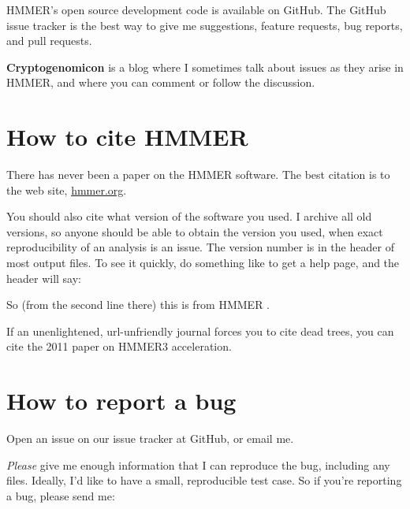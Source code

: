 HMMER's open source development code is available on
GitHub.
The GitHub issue tracker is the best way to give me suggestions,
feature requests, bug reports, and pull requests.

\textbf{Cryptogenomicon}
  is a blog where I sometimes talk about issues as they arise in HMMER, and
where you can comment or follow the discussion.




\section{How to cite HMMER}

There has never been a paper on the HMMER software.  The best citation is to
the web site, \url{hmmer.org}.

You should also cite what version of the software you used. I archive
all old versions, so anyone should be able to obtain the version you
used, when exact reproducibility of an analysis is an issue.  The
version number is in the header of most output files. To see it
quickly, do something like  to get a help page, and
the header will say:


So (from the second line there) this is from HMMER \HMMERversion{}.

If an unenlightened, url-unfriendly journal forces you to cite dead
trees, you can cite the 2011 paper on HMMER3
acceleration.\cite{Eddy11}



\section{How to report a bug}

Open an issue on our issue tracker at GitHub,
or email me.

\emph{Please} give me enough information that I can reproduce the
bug, including any files.  Ideally, I'd like to have a small,
reproducible test case.  So if you're reporting a bug, please send me:


